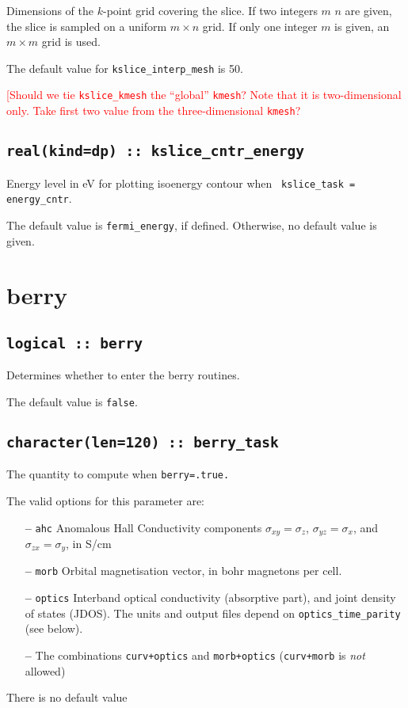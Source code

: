 Dimensions of the $k$-point grid covering the slice.
If two integers $m$ $n$ are given, the slice is sampled on a uniform
$m\times n$ grid.  If only one integer $m$ is given, an $m\times m$
grid is used.

The default value for \verb#kslice_interp_mesh# is 50.

\textcolor{red}{{[Should we tie {\tt kslice\_kmesh} the ``global''
{\tt kmesh}? Note that it is two-dimensional only. Take first
two value from the three-dimensional {\tt kmesh}?}}


\subsection[kslice\_cntr\_energy]{\tt real(kind=dp) :: kslice\_cntr\_energy}

Energy level in eV for plotting isoenergy contour when {\tt
  kslice\_task = energy\_cntr}.

The default value is {\tt fermi\_energy}, if defined. Otherwise, no
default value is given.

\clearpage
\section{berry}

\subsection[berry]{\tt logical :: berry}
Determines whether to enter the berry routines.

The default value is \verb#false#.


\subsection[berry\_task]{\tt character(len=120) ::  berry\_task}
The quantity to compute when {\tt berry=.true.}

The valid options for this parameter are:
\begin{itemize}
\item[{\bf --}] \verb#ahc# Anomalous Hall Conductivity components
  $\sigma_{xy}=\sigma_z$, $\sigma_{yz}=\sigma_x$, and
  $\sigma_{zx}=\sigma_y$, in S/cm
\item[{\bf --}]  \verb#morb# Orbital magnetisation vector, in bohr magnetons per cell.

\item[{\bf --}] \verb#optics# Interband optical conductivity
  (absorptive part), and joint density of states (JDOS).  The units and output
  files depend on {\tt optics\_time\_parity} (see below).

\item[{\bf --}] The combinations {\tt curv+optics} and {\tt morb+optics}
({\tt curv+morb} is {\it not} allowed)

\end{itemize}
There is no default value


